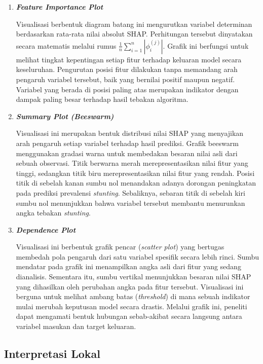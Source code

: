 \begin{enumerate}
    \item \textbf{\textit{Feature Importance Plot}} 
    
    Visualisasi berbentuk diagram batang ini mengurutkan variabel determinan berdasarkan rata-rata nilai absolut SHAP. Perhitungan tersebut dinyatakan secara matematis melalui rumus $\frac{1}{n} \sum_{i=1}^{n} |\phi_i^{(j)}|$. Grafik ini berfungsi untuk melihat tingkat kepentingan setiap fitur terhadap keluaran model secara keseluruhan. Pengurutan posisi fitur dilakukan tanpa memandang arah pengaruh variabel tersebut, baik yang bernilai positif maupun negatif. Variabel yang berada di posisi paling atas merupakan indikator dengan dampak paling besar terhadap hasil tebakan algoritma.

    \item \textbf{\textit{Summary Plot (Beeswarm)}} 
    
    Visualisasi ini merupakan bentuk distribusi nilai SHAP yang menyajikan arah pengaruh setiap variabel terhadap hasil prediksi. Grafik beeswarm menggunakan gradasi warna untuk membedakan besaran nilai asli dari sebuah observasi. Titik berwarna merah merepresentasikan nilai fitur yang tinggi, sedangkan titik biru merepresentasikan nilai fitur yang rendah. Posisi titik di sebelah kanan sumbu nol menandakan adanya dorongan peningkatan pada prediksi prevalensi \textit{stunting}. Sebaliknya, sebaran titik di sebelah kiri sumbu nol menunjukkan bahwa variabel tersebut membantu menurunkan angka tebakan \textit{stunting}.

    \item \textbf{\textit{Dependence Plot}}
    
    Visualisasi ini berbentuk grafik pencar (\textit{scatter plot}) yang bertugas membedah pola pengaruh dari satu variabel spesifik secara lebih rinci. Sumbu mendatar pada grafik ini menampilkan angka asli dari fitur yang sedang dianalisis. Sementara itu, sumbu vertikal menunjukkan besaran nilai SHAP yang dihasilkan oleh perubahan angka pada fitur tersebut. Visualisasi ini berguna untuk melihat ambang batas (\textit{threshold}) di mana sebuah indikator mulai merubah keputusan model secara drastis. Melalui grafik ini, peneliti dapat mengamati bentuk hubungan sebab-akibat secara langsung antara variabel masukan dan target keluaran.
\end{enumerate}

\subsection{Interpretasi Lokal}

